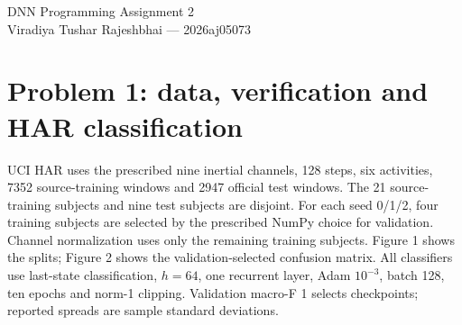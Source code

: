 \documentclass[11pt,a4paper]{article}
\begin{document}
\begin{center}\Large DNN Programming Assignment 2\\\normalsize
Viradiya Tushar Rajeshbhai --- 2026aj05073\end{center}
\section*{Problem 1: data, verification and HAR classification}
UCI HAR uses the prescribed nine inertial channels, 128 steps, six activities,
7352 source-training windows and 2947 official test windows. The 21 source-training
subjects and nine test subjects are disjoint. For each seed 0/1/2, four training
subjects are selected by the prescribed NumPy choice for validation. Channel
normalization uses only the remaining training subjects. Figure 1 shows the splits;
Figure 2 shows the validation-selected confusion matrix.
All classifiers use last-state classification, $h=64$, one recurrent layer,
Adam $10^{-3}$, batch 128, ten epochs and norm-1 clipping. Validation macro-F 1
selects checkpoints; reported spreads are sample standard deviations.
\end{document}
